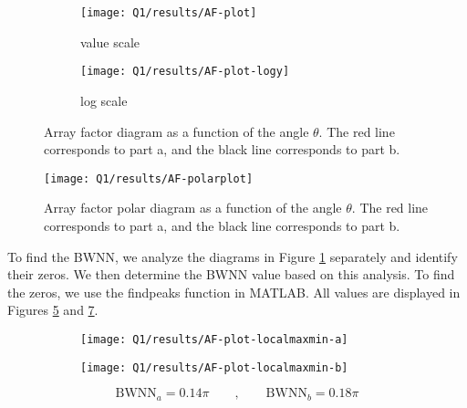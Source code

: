 \documentclass[12pt,onecolumn,a4paper]{article}
\begin{document}
	\begin{figure}[h]
		\begin{subfigure}{.48\linewidth}
			\centering
			\texttt{[image: Q1/results/AF-plot]}
			\caption{value scale}
			\label{fig:af-plot-value}
		\end{subfigure}
		\hfill
		\begin{subfigure}{.48\linewidth}
			\centering
			\texttt{[image: Q1/results/AF-plot-logy]}
			\caption{log scale}
			\label{fig:af-plot-logy}
		\end{subfigure}
		\caption{
			Array factor diagram as a function of the angle $\theta$.
			The red line corresponds to part a, and the black line corresponds to part b.
		}
		\label{fig:af-plot}
	\end{figure}
	
	
	\begin{figure}[H]
		\centering
		\texttt{[image: Q1/results/AF-polarplot]}
		\caption{
			Array factor polar diagram as a function of the angle $\theta$.
		The red line corresponds to part a, and the black line corresponds to part b.
		}
		\label{fig:af-polarplot}
	\end{figure}
	
	
	To find the BWNN, we analyze the diagrams in Figure \ref{fig:af-plot-value} separately and identify their zeros. We then determine the BWNN value based on this analysis. To find the zeros, we use the findpeaks function in MATLAB. All values are displayed in Figures \ref{fig:af-plot-localmaxmin-a} and \ref{fig:af-plot-localmaxmin-b}.
	
	
	
	\begin{figure}
		\centering
		\begin{subfigure}{\linewidth}
			\centering
			\texttt{[image: Q1/results/AF-plot-localmaxmin-a]}
			\caption{}
			\label{fig:af-plot-localmaxmin-a}
		\end{subfigure}
		
		\begin{subfigure}{\linewidth}
			\centering
			\texttt{[image: Q1/results/AF-plot-localmaxmin-b]}
			\caption{}
			\label{fig:af-plot-localmaxmin-b}
		\end{subfigure}
		
		\caption{
			\space
		}
	\end{figure}
	
	
	\begin{equation}
		\text{BWNN}_a = 0.14\pi \qquad, \qquad \text{BWNN}_b = 0.18\pi
	\end{equation}
	
\end{document}
